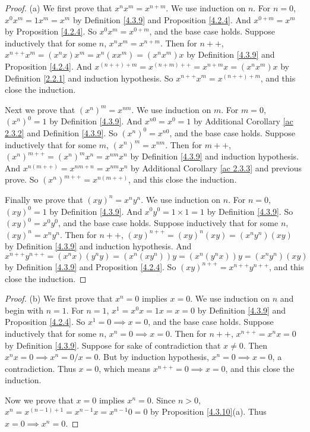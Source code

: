 \begin{proof}{(a)}
We first prove that \(x^n x^m = x^{n + m}\).
We use induction on \(n\).
For \(n = 0\), \(x^0 x^m = 1 x^m = x^m\) by Definition \ref{4.3.9} and Proposition \ref{4.2.4}.
And \(x^{0 + m} = x^m\) by Proposition \ref{4.2.4}.
So \(x^0 x^m = x^{0 + m}\), and the base case holds.
Suppose inductively that for some \(n\), \(x^n x^m = x^{n + m}\).
Then for \(n++\), \(x^{n++} x^m = (x^n x) x^m = x^n (x x^m) = (x^n x^m)x\) by Definition \ref{4.3.9} and Proposition \ref{4.2.4}.
And \(x^{(n++) + m} = x^{(n + m)++} = x^{n + m} x = (x^n x^m)x\) by Definition \ref{2.2.1} and induction hypothesis.
So \(x^{n++} x^m = x^{(n++) + m}\), and this close the induction.

Next we prove that \((x^n)^m = x^{nm}\).
We use induction on \(m\).
For \(m = 0\), \((x^n)^0 = 1\) by Definition \ref{4.3.9}.
And \(x^{n0} = x^0 = 1\) by Additional Corollary \ref{ac 2.3.2} and Definition \ref{4.3.9}.
So \((x^n)^0 = x^{n0}\), and the base case holds.
Suppose inductively that for some \(m\), \((x^n)^m = x^{nm}\).
Then for \(m++\), \((x^n)^{m++} = (x^n)^m x^n = x^{nm} x^n\) by Definition \ref{4.3.9} and induction hypothesis.
And \(x^{n(m++)} = x^{nm + n} = x^{nm} x^n\) by Additional Corollary \ref{ac 2.3.3} and previous prove.
So \((x^n)^{m++} = x^{n(m++)}\), and this close the induction.

Finally we prove that \((xy)^n = x^n y^n\).
We use induction on \(n\).
For \(n = 0\), \((xy)^0 = 1\) by Definition \ref{4.3.9}.
And \(x^0 y^0 = 1 \times 1 = 1\) by Definition \ref{4.3.9}.
So \((xy)^0 = x^0 y^0\), and the base case holds.
Suppose inductively that for some \(n\), \((xy)^n = x^n y^n\).
Then for \(n++\), \((xy)^{n++} = (xy)^n (xy) = (x^n y^n)(xy)\) by Definition \ref{4.3.9} and induction hypothesis.
And \(x^{n++} y^{n++} = (x^n x)(y^n y) = (x^n (x y^n))y = (x^n (y^n x))y = (x^n y^n)(xy)\) by Definition \ref{4.3.9} and Proposition \ref{4.2.4}.
So \((xy)^{n++} = x^{n++} y^{n++}\), and this close the induction.
\end{proof}

\begin{proof}{(b)}
We first prove that \(x^n = 0\) implies \(x = 0\).
We use induction on \(n\) and begin with \(n = 1\).
For \(n = 1\), \(x^1 = x^0 x = 1x = x = 0\) by Definition \ref{4.3.9} and Proposition \ref{4.2.4}.
So \(x^1 = 0 \implies x = 0\), and the base case holds.
Suppose inductively that for some \(n\), \(x^n = 0 \implies x = 0\).
Then for \(n++\), \(x^{n++} = x^n x = 0\) by Definition \ref{4.3.9}.
Suppose for sake of contradiction that \(x \neq 0\).
Then \(x^n x = 0 \implies x^n = 0 / x = 0\).
But by induction hypothesis, \(x^n = 0 \implies x = 0\), a contradiction.
Thus \(x = 0\), which means \(x^{n++} = 0 \implies x = 0\), and this close the induction.

Now we prove that \(x = 0\) implies \(x^n = 0\).
Since \(n > 0\), \(x^n = x^{(n - 1) + 1} = x^{n - 1} x = x^{n - 1} 0 = 0\) by Proposition \ref{4.3.10}(a).
Thus \(x = 0 \implies x^n = 0\).
\end{proof}

